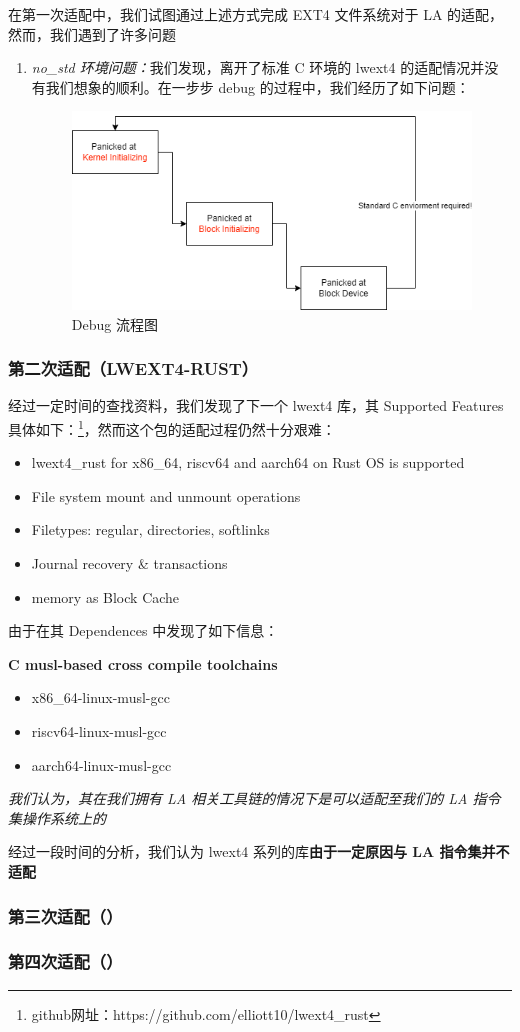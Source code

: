 在第一次适配中，我们试图通过上述方式完成 EXT4 文件系统对于 LA 的适配，然而，我们遇到了许多问题
\begin{enumerate} 
    \item \textit{no_std 环境问题：}我们发现，离开了标准 C 环境的 lwext4 的适配情况并没有我们想象的顺利。在一步步 debug 的过程中，我们经历了如下问题：
    \begin{figure}[htbp] 
        \centering 
        \includegraphics[width=0.5\linewidth]{figs/ext4c.png} 
        \caption{Debug 流程图} 
        \label{debug-ext4c} 
    \end{figure} 
\end{enumerate}

\subsubsection{第二次适配（LWEXT4-RUST）}

经过一定时间的查找资料，我们发现了下一个 lwext4 库，其 Supported Features 具体如下：\footnote{github网址：https://github.com/elliott10/lwext4_rust}，然而这个包的适配过程仍然十分艰难：

\begin{itemize}
    \item lwext4_rust for x86_64, riscv64 and aarch64 on Rust OS is supported
    \item File system mount and unmount operations
    \item Filetypes: regular, directories, softlinks
    \item Journal recovery \& transactions
    \item memory as Block Cache
\end{itemize}

由于在其 Dependences 中发现了如下信息：

\begin{center}
    \textbf{C musl-based cross compile toolchains}
    \begin{itemize}
        \centering
        \item x86_64-linux-musl-gcc
        \item riscv64-linux-musl-gcc
        \item aarch64-linux-musl-gcc
    \end{itemize}
\end{center}

\textit{我们认为，其在我们拥有 LA 相关工具链的情况下是可以适配至我们的 LA 指令集操作系统上的}

经过一段时间的分析，我们认为 lwext4 系列的库\textbf{由于一定原因与 LA 指令集并不适配}

\subsubsection{第三次适配（）}

\subsubsection{第四次适配（）}